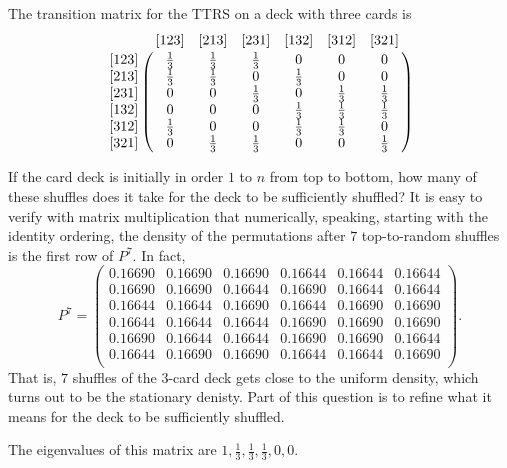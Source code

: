 \documentclass[12pt]{article}
\begin{document}
The transition matrix for the TTRS on a deck with three cards is
\[
    \bordermatrix{
        & [123] & [213] & [231] & [132] & [312] & [321] \cr
        [123]   & \frac{1}{3}   & \frac{1}{3}   & \frac{1}{3}   & 0
        & 0     & 0 \cr
        [213]   & \frac{1}{3}   & \frac{1}{3}   & 0     & \frac{1}{3}
        & 0     & 0 \cr
        [231]   & 0     & 0     & \frac{1}{3}   & 0     & \frac{1}{3}
        & \frac{1}{3} \cr
        [132]   & 0     & 0     & 0     & \frac{1}{3}   & \frac{1}{3}
        & \frac{1}{3} \cr
        [312]   & \frac{1}{3}   & 0     & 0     & \frac{1}{3}   & \frac{1}
        {3}     & 0 \cr
        [321]   & 0     & \frac{1}{3}   & \frac{1}{3}   & 0     & 0
        & \frac{1}{3} \cr
    }
\]

If the card deck is initially in order \( 1 \) to \( n \) from top to
bottom, how many of these shuffles does it take for the deck to be
sufficiently shuffled? It is easy to verify with matrix multiplication
that numerically, speaking, starting with the identity ordering, the
density of the permutations after \( 7 \) top-to-random shuffles is the
first row of \( P^7 \).  In fact,
\[
    P^7 =
    \begin{pmatrix}
      0.16690 & 0.16690 & 0.16690 & 0.16644 & 0.16644 & 0.16644 \\
      0.16690 & 0.16690 & 0.16644 & 0.16690 & 0.16644 & 0.16644 \\
      0.16644 & 0.16644 & 0.16690 & 0.16644 & 0.16690 & 0.16690 \\
      0.16644 & 0.16644 & 0.16644 & 0.16690 & 0.16690 & 0.16690 \\
      0.16690 & 0.16644 & 0.16644 & 0.16690 & 0.16690 & 0.16644 \\
      0.16644 & 0.16690 & 0.16690 & 0.16644 & 0.16644 & 0.16690 \\
    \end{pmatrix}
    .
\] That is, \( 7 \) shuffles of the 3-card deck gets close to the
uniform density, which turns out to be the stationary denisty. Part of
this question is to refine what it means for the deck to be sufficiently
shuffled.

The eigenvalues of this matrix are \( 1, \frac{1}{3}, \frac{1}{3}, \frac
{1}{3}, 0, 0 \).
\end{document}
